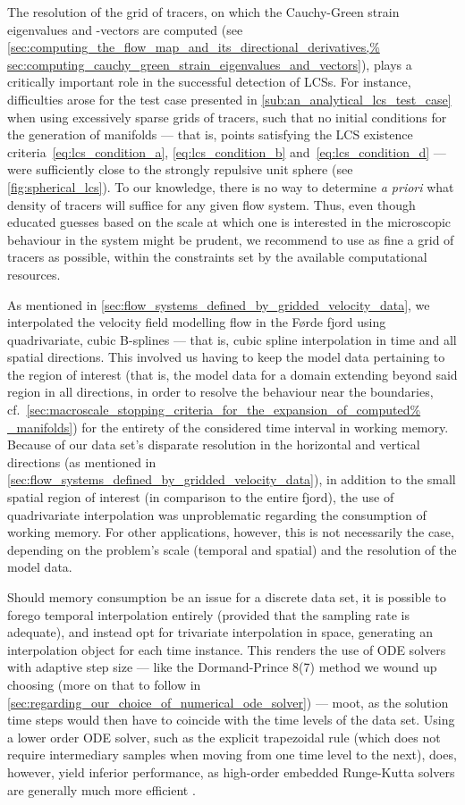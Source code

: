 The resolution of the grid of tracers, on which the Cauchy-Green strain
eigenvalues and -vectors are computed (see
\cref{sec:computing_the_flow_map_and_its_directional_derivatives,%
sec:computing_cauchy_green_strain_eigenvalues_and_vectors}), plays a critically
important role in the successful detection of LCSs. For instance, difficulties
arose for the test case presented in \cref{sub:an_analytical_lcs_test_case}
when using excessively sparse grids of tracers, such that no initial
conditions for the generation of manifolds --- that is, points satisfying the
LCS existence criteria~\eqref{eq:lcs_condition_a}, \eqref{eq:lcs_condition_b}
and~\eqref{eq:lcs_condition_d} --- were sufficiently close to the strongly
repulsive unit sphere (see \cref{fig:spherical_lcs}). To our knowledge,
there is no way to determine \emph{a priori} what density of tracers will
suffice for any given flow system. Thus, even though educated guesses based on
the scale at which one is interested in the microscopic behaviour in the system
might be prudent, we recommend to use as fine a grid of tracers as possible,
within the constraints set by the available computational resources.

As mentioned in \cref{sec:flow_systems_defined_by_gridded_velocity_data}, we
interpolated the velocity field modelling flow in the Førde fjord using
quadrivariate, cubic B-splines --- that is, cubic spline interpolation in time
and all spatial directions. This involved us having to keep the model data
pertaining to the region of interest (that is, the model data for a domain
extending beyond said region in all directions, in order to resolve the
behaviour near the boundaries, cf.\
\cref{sec:macroscale_stopping_criteria_for_the_expansion_of_computed%
_manifolds}) for the entirety of the considered time interval in working
memory.  Because of our data set's disparate resolution in the horizontal and
vertical directions (as mentioned in
\cref{sec:flow_systems_defined_by_gridded_velocity_data}), in addition to the
small spatial region of interest (in comparison to the entire fjord), the use
of quadrivariate interpolation was unproblematic regarding the consumption of
working memory. For other applications, however, this is not necessarily the
case, depending on the problem's scale (temporal and spatial) and the
resolution of the model data.

Should memory consumption be an issue for a discrete data set, it is possible
to forego temporal interpolation entirely (provided that the sampling rate
is adequate), and instead opt for trivariate interpolation in space, generating
an interpolation object for each time instance. This renders the use of
ODE solvers with adaptive step size --- like the Dormand-Prince 8(7) method we
wound up choosing (more on that to follow in
\cref{sec:regarding_our_choice_of_numerical_ode_solver}) --- moot, as the
solution time steps would then have to coincide with the time levels of the
data set. Using a lower order ODE solver, such as the explicit trapezoidal rule
(which does not require intermediary samples when moving from one time level to
the next), does, however, yield inferior performance, as high-order embedded
Runge-Kutta solvers are generally much more efficient
\parencite{loken2017sensitivity}.



